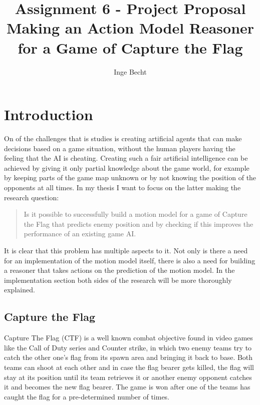\documentclass[a4paper, 12pt]{article}
\author{Inge Becht}
\title{Assignment 6 - Project Proposal\\ 
 Making an Action Model Reasoner for a Game of Capture the Flag}
\begin{document}
\maketitle

\section{Introduction}
On of the challenges that is studies is creating artificial agents that can make
decisions based on a game situation, without the human players having the
feeling that the AI is cheating. Creating such a fair artificial intelligence can be achieved by
giving it only partial knowledge about the game world, for example by keeping parts of
the game map unknown or by not knowing the position of the opponents at all
times. In my thesis I want to focus on the latter making the research question:
\begin{quotation}
Is it possible to
successfully build a motion model for a game of Capture the Flag that
predicts enemy position and by checking if this improves the performance
of an existing game AI.
\end{quotation}
It is clear that this problem has multiple aspects to it. Not
only is there a need for an implementation of the motion model itself, there is
also a need for building a reasoner that takes actions on the prediction of the
motion model. In the implementation section both sides of the research will be
more thoroughly explained. 

\subsection{Capture the Flag}
Capture The Flag (CTF) is a well known combat objective found in video games
like the Call of Duty series and Counter strike, in which two enemy teams try to
catch the other one's flag from its spawn area and bringing it back to base.
Both teams can shoot at each other and in case the flag bearer gets killed, the
flag will stay at its position until its team retrieves it or another enemy
opponent catches it and becomes the new flag bearer. The game is won after one
of the teams has caught the flag for a pre-determined number of times.

\end{document}
